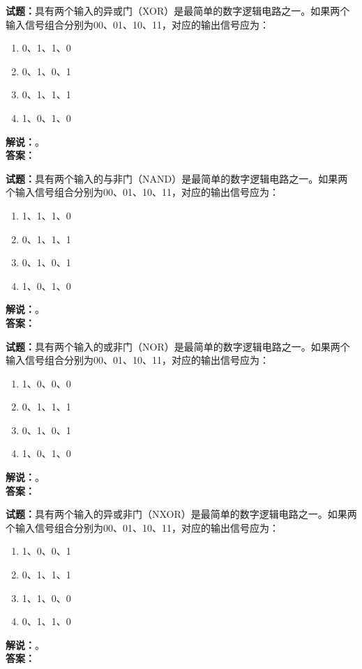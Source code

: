 \documentclass{ctexbook}
\begin{document}
\bigskip

\noindent\textbf{试题：}具有两个输入的异或门（XOR）是最简单的数字逻辑电路之一。如果两个输入信号组合分别为00、01、10、11，对应的输出信号应为：
\begin{enumerate}[leftmargin=3em]
  \item 0、1、1、0
  \item 0、1、0、1
  \item 0、1、1、1
  \item 1、0、1、0
\end{enumerate}
\noindent\textbf{解说：}\textbf{}。\\\noindent\textbf{答案：}

\bigskip

\noindent\textbf{试题：}具有两个输入的与非门（NAND）是最简单的数字逻辑电路之一。如果两个输入信号组合分别为00、01、10、11，对应的输出信号应为：
\begin{enumerate}[leftmargin=3em]
  \item 1、1、1、0
  \item 0、1、1、1
  \item 0、1、0、1
  \item 1、0、1、0
\end{enumerate}
\noindent\textbf{解说：}\textbf{}。\\\noindent\textbf{答案：}

\bigskip

\noindent\textbf{试题：}具有两个输入的或非门（NOR）是最简单的数字逻辑电路之一。如果两个输入信号组合分别为00、01、10、11，对应的输出信号应为：
\begin{enumerate}[leftmargin=3em]
  \item 1、0、0、0
  \item 0、1、1、1
  \item 0、1、0、1
  \item 1、0、1、0
\end{enumerate}
\noindent\textbf{解说：}\textbf{}。\\\noindent\textbf{答案：}

\bigskip

\noindent\textbf{试题：}具有两个输入的异或非门（NXOR）是最简单的数字逻辑电路之一。如果两个输入信号组合分别为00、01、10、11，对应的输出信号应为：
\begin{enumerate}[leftmargin=3em]
  \item 1、0、0、1
  \item 0、1、1、1
  \item 1、1、0、0
  \item 0、1、1、0
\end{enumerate}
\noindent\textbf{解说：}\textbf{}。\\\noindent\textbf{答案：}
\end{document}
